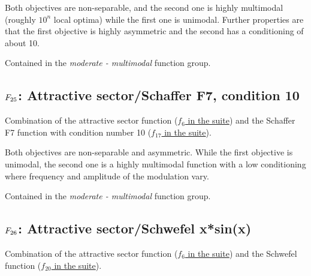 Both objectives are non-separable, and the second one
is highly multimodal (roughly \(10^n\) local
optima) while the first one is unimodal. Further
properties are that the first objective is highly
asymmetric and the second has a conditioning of about 10.

Contained in the \emph{moderate - multimodal} function group.



\subsection[\texorpdfstring{\protect\(F_{25}\protect\): Attractive sector/Schaffer F7, condition 10}{F25: Attractive sector/Schaffer F7, condition 10}]{\texorpdfstring{\protect\(F_{25}\protect\): Attractive sector/Schaffer F7, condition 10}{}}
\label{index:attractive-sector-schaffer-f7-condition-10}\label{index:f25}
Combination of the attractive sector function (\href{https://coco.gforge.inria.fr/downloads/download16.00/bbobdocfunctions.pdf\#page=30}{\(f_6\) in the \bbob suite}) and the Schaffer F7 function with condition number 10
(\href{https://coco.gforge.inria.fr/downloads/download16.00/bbobdocfunctions.pdf\#page=85}{\(f_{17}\) in the \bbob suite}).

Both objectives are non-separable and asymmetric.
While the first objective is unimodal, the second one is
a highly multimodal function with a low conditioning where
frequency and amplitude of the modulation vary.

Contained in the \emph{moderate - multimodal} function group.



\subsection[\texorpdfstring{\protect\(F_{26}\protect\): Attractive sector/Schwefel x*sin(x)}{F26: Attractive sector/Schwefel x*sin(x)}]{\texorpdfstring{\protect\(F_{26}\protect\): Attractive sector/Schwefel x*sin(x)}{}}
\label{index:f26}\label{index:attractive-sector-schwefel-x-sin-x}
Combination of the attractive sector function (\href{https://coco.gforge.inria.fr/downloads/download16.00/bbobdocfunctions.pdf\#page=30}{\(f_6\) in the \bbob suite}) and the Schwefel function (\href{https://coco.gforge.inria.fr/downloads/download16.00/bbobdocfunctions.pdf\#page=100}{\(f_{20}\) in the \bbob suite}).

